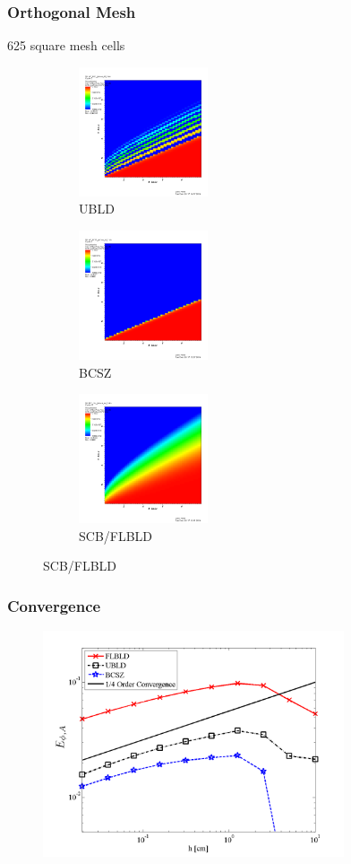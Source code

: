 \documentclass{beamer}
\begin{document}
\begin{frame}
\frametitle{Orthogonal Mesh}
625 square mesh cells
\centering
\begin{figure}[!hbp]
	\centering
	\begin{subfigure}{0.32\textwidth}
		\centering
		\includegraphics[width=1.5in]{bild_64} 
		\caption{UBLD}
  \end{subfigure}
	\begin{subfigure}{0.32\textwidth}
		\centering
		\includegraphics[width=1.5in]{bcsz_64}		
		\caption{BCSZ}
	\end{subfigure}
	\begin{subfigure}{0.32\textwidth}
		\centering
		\includegraphics[width=1.5in]{cb_64}
		\caption{SCB/FLBLD}
	\end{subfigure}
\end{figure}

\end{frame}

\begin{frame}
\frametitle{Convergence}
%
\begin{figure}[!htp]
		\centering
		\includegraphics[width=3.5in]{glance_convergence} 		
\end{figure}
%
\end{frame}
\end{document}
